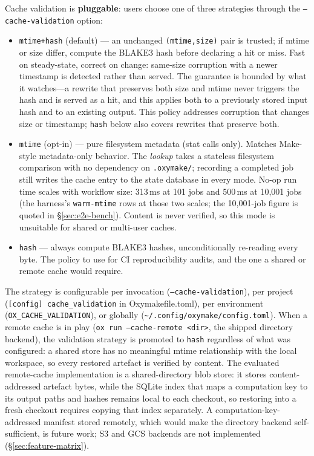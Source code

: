 \documentclass[12pt,a4paper]{article}
\newcommand{\code}[1]{{\texttt{\small\color{inlinecode}#1}}}
\begin{document}
Cache validation is \textbf{pluggable}: users choose one of
three strategies through the \code{--cache-validation} option:

\begin{itemize}
\item \code{mtime+hash} (default) --- an unchanged \code{(mtime,size)}
  pair is trusted; if mtime or size differ, compute the
  BLAKE3 hash before declaring a hit or miss.  Fast on steady-state,
  correct on change: same-size corruption with a newer timestamp is
  detected rather than served.  The guarantee is bounded by what it
  watches---a rewrite that preserves both size and mtime never triggers
  the hash and is served as a hit, and this applies both to a
  previously stored input hash and to an existing output.  This policy
  addresses corruption that changes size or timestamp; \code{hash}
  below also covers rewrites that preserve both.
\item \code{mtime} (opt-in) --- pure filesystem metadata (stat calls only).
  Matches Make-style metadata-only behavior. The \emph{lookup} takes a
  stateless filesystem comparison with no dependency on
  \code{.oxymake/}; recording a completed job still writes the cache
  entry to the state database in every mode. No-op run time scales
  with workflow size: 313\,ms at 101 jobs and 500\,ms at
  10{,}001 jobs (the harness's \code{warm-mtime} rows at those two
  scales; the 10{,}001-job figure is quoted in \S\ref{sec:e2e-bench}). Content is never verified, so this
  mode is unsuitable for shared or multi-user caches.
\item \code{hash} --- always compute BLAKE3 hashes, unconditionally
  re-reading every byte.  The policy to use for CI reproducibility
  audits, and the one a shared or remote cache would require.
\end{itemize}

\noindent The strategy is configurable per invocation (\code{--cache-validation}),
per project (\code{[config] cache\_validation} in Oxymakefile.toml),
per environment (\code{OX\_CACHE\_VALIDATION}), or globally
(\code{\textasciitilde/.config/oxymake/config.toml}).
When a remote cache is in play (\code{ox run --cache-remote <dir>}, the
shipped directory backend), the validation strategy is promoted to
\code{hash} regardless of what was configured: a shared store has no
meaningful mtime relationship with the local workspace, so every
restored artefact is verified by content. The evaluated remote-cache
implementation is a shared-directory blob store: it stores
content-addressed artefact bytes, while the SQLite index that maps a
computation key to its output paths and hashes remains local to each
checkout, so restoring into a fresh checkout requires copying that
index separately. A computation-key-addressed manifest stored
remotely, which would make the directory backend self-sufficient, is
future work; S3 and GCS backends are not implemented
(\S\ref{sec:feature-matrix}).
\end{document}
